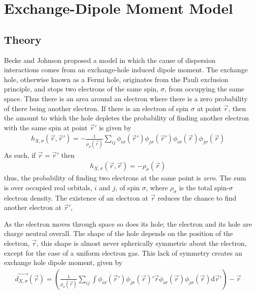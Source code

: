 \documentclass[10pt,a4paper,twocolumn,twoside]{extarticle}
\renewcommand{\d}{\text{d}}
\begin{document}
	


	\section{Exchange-Dipole Moment Model}
	\subsection{Theory}
	Becke and Johnson proposed a model\cite{XDM-Original} in which the cause of dispersion interactions comes from an exchange-hole induced dipole moment.\cite{XDM-dipole,XDM-HF,XDM-HigherOrder} The exchange hole, otherwise known as a Fermi hole, originates from the Pauli exclusion principle, and stops two electrons of the same spin, $\sigma$, from occupying the same space. Thus there is an area around an electron where there is a zero probability of there being another electron. If there is an electron of spin $\sigma$ at point $\vec{r}$, then the amount to which the hole depletes the probability of finding another electron with the same spin at point $\vec{r}'$ is given by 
	\begin{align}
		h_{X,\sigma}(\vec{r},\vec{r}') = -\frac{1}{\rho_\sigma(\vec{r})} \sum_{ij} 
										\phi_{i\sigma}(\vec{r}') \phi_{j\sigma}(\vec{r}')
										\phi_{i\sigma}(\vec{r}) \phi_{j\sigma}(\vec{r}) 
	\end{align}
	As such, if $\vec{r} = \vec{r}'$ then 
	\begin{align}
		h_{X,\sigma}(\vec{r}, \vec{r}) = -\rho_\sigma(\vec{r})
	\end{align}
	thus, the probability of finding two electrons at the same point is \emph{zero}.
	The sum is over occupied real orbitals, $i$ and $j$, of spin $\sigma$, where $\rho_\sigma$ is the total spin-$\sigma$ electron density. The existence of an electron at $\vec{r}$ reduces the chance to find another electron at $\vec{r}'$, 

	As the electron moves through space so does its hole; the electron and its hole are charge neutral overall. 
	The shape of the hole depends on the position of the electron, $\vec{r}$, this shape is almost never spherically symmetric about the electron, except for the case of a uniform electron gas. This lack of symmetry creates an exchange hole dipole moment, given by 
	\footnotesize
	\begin{align}
		\label{eq:exchange-dipole}
		\vec{d_{X,\sigma}}(\vec{r}) = \left( \frac{1}{\rho_\sigma(\vec{r})} \sum_{ij}\int
									 \phi_{i\sigma}(\vec{r}') \phi_{j\sigma}(\vec{r})' 
									 \vec{r}\phi_{i\sigma}(\vec{r}) \phi_{j\sigma}(\vec{r}) 
									 \d\vec{r}'\right) - \vec{r}
	\end{align}
	\normalsize
\end{document}
